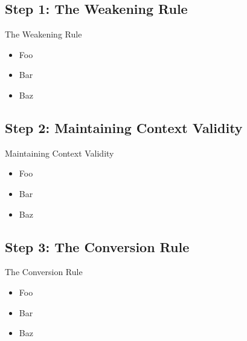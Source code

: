 \documentclass{beamer}
\begin{document}
\subsection{Step 1: The Weakening Rule}

\begin{frame}{The Weakening Rule}

  \begin{itemize}
    \item
      Foo
    \item
      Bar
    \item
      Baz
  \end{itemize}

\end{frame}


\subsection{Step 2: Maintaining Context Validity}

\begin{frame}{Maintaining Context Validity}

  \begin{itemize}
    \item
      Foo
    \item
      Bar
    \item
      Baz
  \end{itemize}

\end{frame}


\subsection{Step 3: The Conversion Rule}

\begin{frame}{The Conversion Rule}

  \begin{itemize}
    \item
      Foo
    \item
      Bar
    \item
      Baz
  \end{itemize}

\end{frame}


\end{document}
